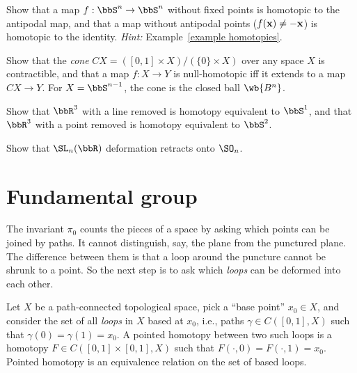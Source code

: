 \begin{xca}
    Show that a map $f:\bbS^n\to\bbS^n$ without fixed points is homotopic to the antipodal map, and that a map without antipodal points ($f(\bf{x})\neq-\bf{x}$) is homotopic to the identity. \emph{Hint:} Example~\ref{example homotopies}.
\end{xca}
\begin{xca}
    Show that the \emph{cone} $CX=([0,1]\times X)/(\{0\}\times X)$ over any space $X$ is contractible, and that a map $f:X\to Y$ is null-homotopic iff it extends to a map $CX\to Y$. For $X=\bbS^{n-1}$, the cone is the closed ball $\wb{B^n}$.
\end{xca}
\begin{xca}
    Show that $\bbR^3$ with a line removed is homotopy equivalent to $\bbS^1$, and that $\bbR^3$ with a point removed is homotopy equivalent to $\bbS^2$.
\end{xca}
\begin{xca}
    Show that $\SL_n(\bbR)$ deformation retracts onto $\SO_n$.
\end{xca}


\section{Fundamental group}\label{sec: fundamental group}

The invariant $\pi_0$ counts the pieces of a space by asking which points can be joined by paths. It cannot distinguish, say, the plane from the punctured plane. The difference between them is that a loop around the puncture cannot be shrunk to a point. So the next step is to ask which \emph{loops} can be deformed into each other.

\begin{defn}
    Let $X$ be a path-connected topological space, pick a ``base point'' $x_0\in X$, and consider the set of all \emph{loops} in $X$ based at $x_0$, i.e., paths $\gamma\in C([0,1], X)$ such that $\gamma(0)=\gamma(1)=x_0$. A pointed homotopy between two such loops is a homotopy $F\in C([0,1]\times[0,1],X)$ such that $F(\cdot,0)=F(\cdot,1)=x_0$. Pointed homotopy is an equivalence relation on the set of based loops.
\end{defn}

